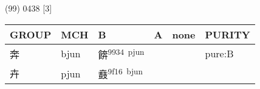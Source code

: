 \documentclass[14pt,a4paper]{scrartcl}
\begin{document}
(99) 0438 {[}3{]}

\begin{longtable}[c]{@{}llllll@{}}
\toprule
\begin{minipage}[b]{0.14\columnwidth}\raggedright\strut
GROUP
\strut\end{minipage} &
\begin{minipage}[b]{0.14\columnwidth}\raggedright\strut
MCH
\strut\end{minipage} &
\begin{minipage}[b]{0.14\columnwidth}\raggedright\strut
B
\strut\end{minipage} &
\begin{minipage}[b]{0.14\columnwidth}\raggedright\strut
A
\strut\end{minipage} &
\begin{minipage}[b]{0.14\columnwidth}\raggedright\strut
none
\strut\end{minipage} &
\begin{minipage}[b]{0.14\columnwidth}\raggedright\strut
PURITY
\strut\end{minipage}\tabularnewline
\midrule
\endhead
\begin{minipage}[t]{0.14\columnwidth}\raggedright\strut
奔
\strut\end{minipage} &
\begin{minipage}[t]{0.14\columnwidth}\raggedright\strut
bjun
\strut\end{minipage} &
\begin{minipage}[t]{0.14\columnwidth}\raggedright\strut
餴\textsuperscript{9934~pjun}
\strut\end{minipage} &
\begin{minipage}[t]{0.14\columnwidth}\raggedright\strut
\strut\end{minipage} &
\begin{minipage}[t]{0.14\columnwidth}\raggedright\strut
\strut\end{minipage} &
\begin{minipage}[t]{0.14\columnwidth}\raggedright\strut
pure:B
\strut\end{minipage}\tabularnewline
\begin{minipage}[t]{0.14\columnwidth}\raggedright\strut
卉
\strut\end{minipage} &
\begin{minipage}[t]{0.14\columnwidth}\raggedright\strut
pjun
\strut\end{minipage} &
\begin{minipage}[t]{0.14\columnwidth}\raggedright\strut
鼖\textsuperscript{9f16~bjun}

\end{minipage}
\end{longtable}
\end{document}
